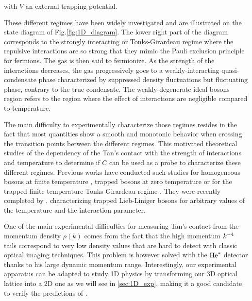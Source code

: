 \noindent with $V$ an external trapping potential. 


These different regimes have been widely investigated \cite{petrov2000regimes} and are illustrated on the state diagram of Fig.\ref{fig:1D_diagram}. The lower right part of the diagram corresponds to the strongly interacting or Tonks-Girardeau regime where the repulsive interactions are so strong that they mimic the Pauli exclusion principle for fermions. The gas is then said to fermionize. As the strength of the interactions decreases, the gas progressively goes to a weakly-interacting quasi-condensate phase characterized by suppressed density fluctuations but fluctuating phase, contrary to the true condensate. The weakly-degenerate ideal bosons region refers to the region where the effect of interactions are negligible compared to temperature. 

The main difficulty to experimentally characterize those regimes resides in the fact that most quantities show a smooth and monotonic behavior when crossing the transition points between the different regimes. This motivated theoretical studies of the dependency of the Tan's contact with the strength of interactions and temperature to determine if $C$ can be used as a probe to characterize these different regimes. Previous works have conducted such studies for homogeneous bosons at finite temperature \cite{kheruntsyan2003pair,kormos2009expectation}, trapped bosons at zero temperature \cite{minguzzi2002high,olshanii2003short} or for the trapped finite temperature Tonks-Girardeau regime \cite{vignolo2013universal}. They were recently completed by \cite{yao2018tan}, characterizing trapped Lieb-Liniger bosons for arbitrary values of the temperature and the interaction parameter.

One of the main experimental difficulties for measuring Tan's contact from the momentum density $\rho(k)$ comes from the fact that the high momentum $k^{-4}$ tails correspond to very low density values that are hard to detect with classic optical imaging techniques. This problem is however solved with the $\mathrm{He}^*$ detector thanks to his large dynamic momentum range. Interestingly, our experimental apparatus can be adapted to study 1D physics by transforming our 3D optical lattice into a 2D one as we will see in \ref{sec:1D_exp}, making it a good candidate to verify the predictions of \cite{yao2018tan}.


